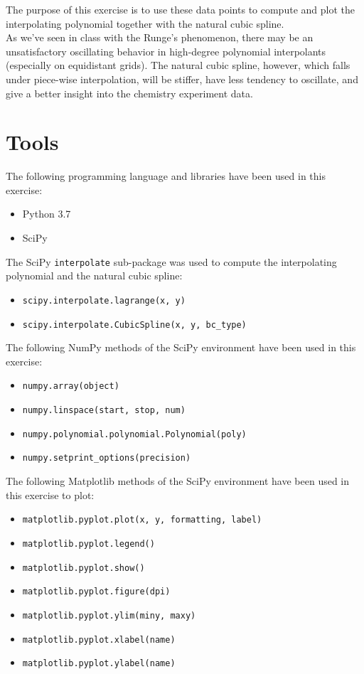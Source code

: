 \documentclass{article}
\newcommand{\code}{\texttt}
\begin{document}
The purpose of this exercise is to use these data points to compute and plot the interpolating polynomial together with the natural cubic spline.\\

As we've seen in class with the Runge's phenomenon, there may be an unsatisfactory oscillating behavior in high-degree polynomial interpolants (especially on equidistant grids). The natural cubic spline, however, which falls under piece-wise interpolation, will be stiffer, have less tendency to oscillate, and give a better insight into the chemistry experiment data. 

\section{Tools}
The following programming language and libraries have been used in this exercise:
\begin{itemize}
  \item Python 3.7
  \item SciPy
\end{itemize}
The SciPy \code{interpolate} sub-package was used to compute the interpolating polynomial and the natural cubic spline:
\begin{itemize}
  \item \code{scipy.interpolate.lagrange(x, y)}
  \item \code{scipy.interpolate.CubicSpline(x, y, bc\_type)}
\end{itemize}

The following NumPy methods of the SciPy environment have been used in this exercise:
\begin{itemize}
  \item \code{numpy.array(object)}
  \item \code{numpy.linspace(start, stop, num)}
  \item \code{numpy.polynomial.polynomial.Polynomial(poly)}
  \item \code{numpy.setprint\_options(precision)}
  \end{itemize}
The following Matplotlib methods of the SciPy environment have been used in this exercise to plot:
 \begin{itemize}
  \item \code{matplotlib.pyplot.plot(x, y, formatting, label)}
  \item \code{matplotlib.pyplot.legend()}
  \item \code{matplotlib.pyplot.show()}
  \item \code{matplotlib.pyplot.figure(dpi)}
  \item \code{matplotlib.pyplot.ylim(miny, maxy)}
  \item \code{matplotlib.pyplot.xlabel(name)}
  \item \code{matplotlib.pyplot.ylabel(name)}
  \end{itemize}
  
\end{document}
